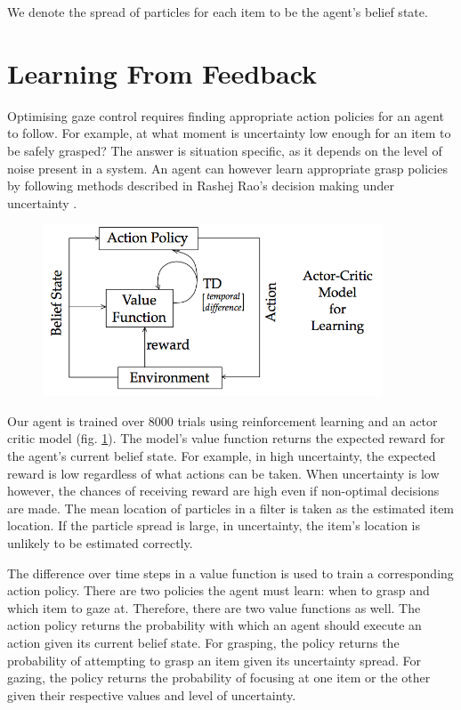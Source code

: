 \documentclass[11]{article}
\begin{document}
We denote the spread of particles for each item to be the agent's belief state. 

\section{Learning From Feedback}
Optimising gaze control requires finding appropriate action policies for an agent to follow.  
For example, at what moment is uncertainty low enough for an item to be safely grasped? 
The answer is situation specific, as it depends on the level of noise present in a system. 
An agent can however learn appropriate grasp policies by following methods described in Rashej Rao's decision making under uncertainty \cite{rao2010}.

\begin{figure}[!h]
	\centering
	\includegraphics[width=0.9\textwidth]{figures/actorcritic.png}
	\caption{}
	\label{fig:actor-critic}
\end{figure} 

Our agent is trained over 8000 trials using reinforcement learning and an actor critic model (fig. \ref{fig:actor-critic}). 
The model's value function returns the expected reward for the agent's current belief state.
For example, in high uncertainty, the expected reward is low regardless of what actions can be taken.
When uncertainty is low however, the chances of receiving reward are high even if non-optimal decisions are made.  
The mean location of particles in a filter is taken as the estimated item location.
If the particle spread is large, in uncertainty, the item's location is unlikely to be estimated correctly. 

The difference over time steps in a value function is used to train a corresponding action policy.
There are two policies the agent must learn: when to grasp and which item to gaze at.
Therefore, there are two value functions as well. 
The action policy returns the probability with which an agent should execute an action given its current belief state.
For grasping, the policy returns the probability of attempting to grasp an item given its uncertainty spread.
For gazing, the policy returns the probability of focusing at one item or the other given their respective values and level of uncertainty.
\end{document}

